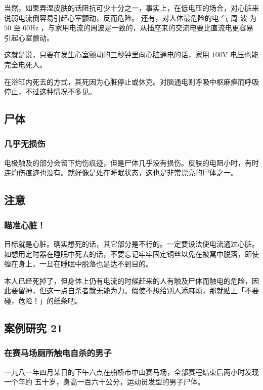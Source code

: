 \documentclass[UTF8]{ctexart}
\begin{document}
当然，如果弄湿皮肤的话阻抗可少十分之一，事实上，在低电压的场合，对心脏来说弱电流倒容易引起心室颤动，反而危险。
还有，对人体最危险的电 气 周 波 为 $50$ 至 $60\si{\hertz}$ ，与家用电流的周波是一致的，从插座来的交流电要比直流电更容易引起心室颤动。

这就是说，只要在发生心室颤动的三秒钟里向心脏通电的话，家用 $100\si{\volt}$ 电压也能完全电死人。

在浴缸内死去的方式，其死因为心脏停止或休克。对脑通电则呼吸中枢麻痹而呼吸停止，不过这种情况不多见。

\subsection{尸体}

\subsubsection*{几乎无损伤}

电极触及的部分会留下灼伤痕迹，但是尸体几乎没有损伤。皮肤的电阻小时，有时连灼伤痕迹也没有。就好像是处在睡眠状态，这也是非常漂亮的尸体之一。

\subsection{注意}

\subsubsection*{瞄准心脏！}

目标就是心脏。确实想死的话，其它部分是不行的。一定要设法使电流通过心脏。如想用定时器在睡眠中死去的话，不要忘记牢牢固定铜丝以免在被窝中脱落，即使缠在身上，一旦在睡眠中脱落也是达不到目的。

本人已经死掉了，但身体上仍有电流的时候赶来的人有触及尸体而触电的危险，因此要留神，但这一点自杀者就无能为力。假使不想给别人添麻烦，那就贴上「不要碰，危险！」的纸条吧。


\subsection{案例研究 21}

\subsubsection*{在赛马场厕所触电自杀的男子}

一九八一年四月某日的下午六点在船桥市中山赛马场，全部赛程结束后两小时发现一个年约
五十岁，身高一百六十公分，运动员发型的男子尸体。
\end{document}
